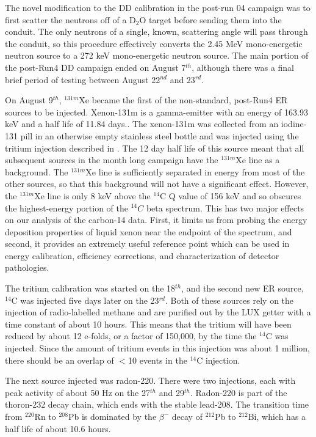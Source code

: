The novel modification to the DD calibration in the post-run 04 campaign was to first scatter the neutrons off of a D$_2$O target before sending them into the conduit. The only neutrons of a single, known, scattering angle will pass through the conduit, so this procedure effectively converts the 2.45 MeV mono-energetic neutron source to a 272 keV mono-energetic neutron source. The main portion of the post-Run4 DD campaign ended on August 7$^{th}$, although there was a final brief period of testing between August 22$^{nd}$ and 23$^{rd}$\cite{lux_dd1}.


On August 9$^{th}$, $^{131m}$Xe became the first of the non-standard, post-Run4 ER sources to be injected. Xenon-131m is a gamma-emitter with an energy of 163.93 keV and a half life of 11.84 days.\cite{nuclide}. The xenon-131m was collected from an iodine-131 pill in an otherwise empty stainless steel bottle and was injected using the tritium injection described in \cite{lux_tritium}. The 12 day half life of this source meant that all subsequent sources in the month long campaign have the $^{131m}$Xe line as a background. The $^{131m}$Xe line is sufficiently separated in energy from most of the other sources, so that this background will not have a significant effect. However, the $^{131m}$Xe line is only 8 keV above the $^{14}$C Q value of 156 keV and so obscures the highest-energy portion of the $^{14}C$ beta spectrum. This has two major effects on our analysis of the carbon-14 data. First, it limits us from probing the energy deposition properties of liquid xenon near the endpoint of the spectrum, and second, it provides an extremely useful reference point which can be used in energy calibration, efficiency corrections, and characterization of detector pathologies.

The tritium calibration was started on the 18$^{th}$, and the second new ER source, $^{14}$C was injected five days later on the 23$^{rd}$. Both of these sources rely on the injection of radio-labelled methane and are purified out by the LUX getter with a time constant of about 10 hours. This means that the tritium will have been reduced by about 12 e-folds, or a factor of 150,000, by the time the $^{14}$C was injected. Since the amount of tritium events in this injection was about 1 million, there should be an overlap of $<$10 events in the $^{14}$C injection.

The next source injected was radon-220. There were two injections, each with peak activity of about 50 Hz on the 27$^{th}$ and 29$^{th}$. Radon-220 is part of the thoron-232 decay chain, which ends with the stable lead-208. The transition time from $^{220}$Rn to $^{208}$Pb is dominated by the $\beta^-$ decay of $^{212}$Pb to $^{212}$Bi, which has a half life of about 10.6 hours. 

